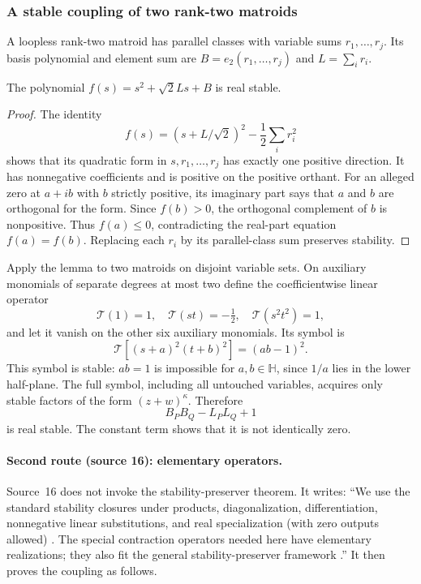 \documentclass[11pt]{article}
\numberwithin{equation}{section}
\theoremstyle{definition}\newtheorem{definition}[theorem]{Definition}\newtheorem{remark}[theorem]{Remark}
\newcommand{\HH}{\mathbb H}                %
\begin{document}
\subsubsection{A stable coupling of two rank-two matroids}
A loopless rank-two matroid has parallel classes with variable sums $r_1,\ldots,r_j$. Its basis polynomial and element sum are
$B=e_2(r_1,\ldots,r_j)$ and $L=\sum_i r_i$.

\begin{lemma}\label{pgr:r:rc:lem:quadratic}
The polynomial $f(s)=s^2+\sqrt2 Ls+B$ is real stable.
\end{lemma}
\begin{proof}
The identity
\[
 f(s)=(s+L/\sqrt2)^2-\frac12\sum_i r_i^2
\]
shows that its quadratic form in $s,r_1,\ldots,r_j$ has exactly one positive direction. It has nonnegative coefficients and is positive on the positive orthant. For an alleged zero at $a+ib$ with $b$ strictly positive, its imaginary part says that $a$ and $b$ are orthogonal for the form. Since $f(b)>0$, the orthogonal complement of $b$ is nonpositive. Thus $f(a)\le0$, contradicting the real-part equation $f(a)=f(b)$. Replacing each $r_i$ by its parallel-class sum preserves stability.
\end{proof}
Apply the lemma to two matroids on disjoint variable sets. On auxiliary monomials of separate degrees at most two define the coefficientwise linear operator
\[
 \mathcal T(1)=1,\quad \mathcal T(st)=-\tfrac12,\quad
 \mathcal T(s^2t^2)=1,
\]
and let it vanish on the other six auxiliary monomials. Its symbol is
\[
 \mathcal T[(s+a)^2(t+b)^2]=(ab-1)^2.
\]
This symbol is stable: $ab=1$ is impossible for $a,b\in\HH$, since $1/a$ lies in the lower half-plane. The full symbol, including all untouched variables, acquires only stable factors of the form $(z+w)^\kappa$. Therefore
\begin{equation}\label{pgr:r:rc:eq:coupling}
 B_PB_Q-L_PL_Q+1
\end{equation}
is real stable. The constant term shows that it is not identically zero.

\paragraph{Second route (source 16): elementary operators.} Source~16
does not invoke the stability-preserver theorem. It writes: ``We use the
standard stability closures under products, diagonalization,
differentiation, nonnegative linear substitutions, and real specialization
(with zero outputs allowed) \cite{WagnerSurvey}. The special contraction
operators needed here have elementary realizations; they also fit the
general stability-preserver framework \cite{BB}.'' It then proves the
coupling as follows.
\end{document}

